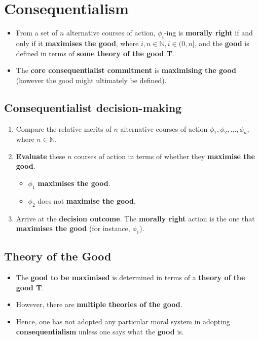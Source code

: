 \documentclass[11pt]{article}
\begin{document}
 \newpage
\section{Consequentialism}
\label{sec:org25f4e40}
\begin{itemize}
\item From a set of \(n\) alternative courses of action, \(\phi_i\)-ing is \textbf{morally right} if and only if it \textbf{maximises the good}, where \(i, n \in \mathbb{N}, i \in (0, n]\), and the \textbf{good} is defined in terms of \textbf{some theory of the good T}.
\item The \textbf{core consequentialist commitment} is \textbf{maximising the good} (however the good might ultimately be defined).
\end{itemize}
\subsection{Consequentialist decision-making}
\label{sec:orgea8aab5}
\begin{enumerate}
\item Compare the relative merits of \(n\) alternative courses of action \(\phi_1, \phi_2, \ldots, \phi_n\), where \(n \in \mathbb{N}\).
\item \textbf{Evaluate} these \(n\) courses of action in terms of whether they \textbf{maximise the good}.
\begin{itemize}
\item \(\phi_1\) \textbf{maximises the good}.
\item \(\phi_2\) does not \textbf{maximise the good}.
\end{itemize}
\item Arrive at the \textbf{decision outcome}. The \textbf{morally right} action is the one that \textbf{maximises the good} (for instance, \(\phi_1\)).
\end{enumerate}

 \newpage
\subsection{Theory of the Good}
\label{sec:org90f9355}
\begin{itemize}
\item The \textbf{good to be maximised} is determined in terms of a \textbf{theory of the good T}.
\item However, there are \textbf{multiple theories of the good}.
\item Hence, one has not adopted any particular moral system in adopting \textbf{consequentialism} unless one says what the \textbf{good} is.
\end{itemize}
\end{document}

